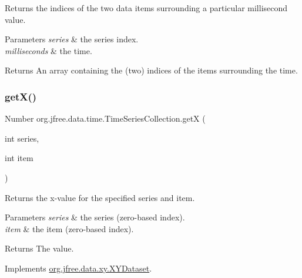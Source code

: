 Returns the indices of the two data items surrounding a particular millisecond value.


\begin{DoxyParams}{Parameters}
{\em series} & the series index. \\
\hline
{\em milliseconds} & the time.\\
\hline
\end{DoxyParams}
\begin{DoxyReturn}{Returns}
An array containing the (two) indices of the items surrounding the time. 
\end{DoxyReturn}
\mbox{\label{classorg_1_1jfree_1_1data_1_1time_1_1_time_series_collection_afaf4cb9df5f63edbe8b1eff071b9b8d0}} 
\subsubsection{\texorpdfstring{get\+X()}{getX()}\hspace{0.1cm}{\footnotesize\ttfamily [1/2]}}
{\footnotesize\ttfamily Number org.\+jfree.\+data.\+time.\+Time\+Series\+Collection.\+getX (\begin{DoxyParamCaption}\item[{int}]{series,  }\item[{int}]{item }\end{DoxyParamCaption})}

Returns the x-\/value for the specified series and item.


\begin{DoxyParams}{Parameters}
{\em series} & the series (zero-\/based index). \\
\hline
{\em item} & the item (zero-\/based index).\\
\hline
\end{DoxyParams}
\begin{DoxyReturn}{Returns}
The value. 
\end{DoxyReturn}


Implements \mbox{\hyperlink{interfaceorg_1_1jfree_1_1data_1_1xy_1_1_x_y_dataset_a85c75ba5b69b551e96afd29d1732ba22}{org.\+jfree.\+data.\+xy.\+X\+Y\+Dataset}}.

\mbox{\label{classorg_1_1jfree_1_1data_1_1time_1_1_time_series_collection_a5cc2363473b0fcddadd219bba6fae88f}} 
